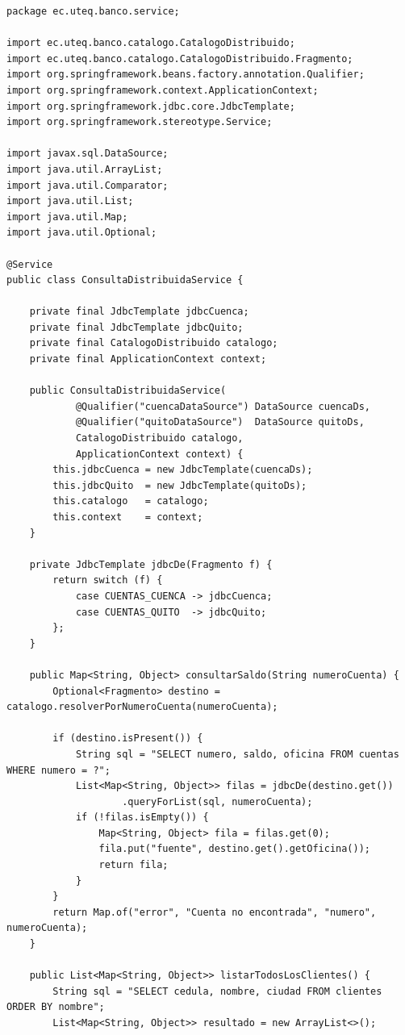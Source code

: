 \documentclass[11pt,a4paper]{article}
\begin{document}
\begin{lstlisting}[style=JavaStyle,caption={ConsultaDistribuidaService.java: consulta y union de resultados}]
package ec.uteq.banco.service;

import ec.uteq.banco.catalogo.CatalogoDistribuido;
import ec.uteq.banco.catalogo.CatalogoDistribuido.Fragmento;
import org.springframework.beans.factory.annotation.Qualifier;
import org.springframework.context.ApplicationContext;
import org.springframework.jdbc.core.JdbcTemplate;
import org.springframework.stereotype.Service;

import javax.sql.DataSource;
import java.util.ArrayList;
import java.util.Comparator;
import java.util.List;
import java.util.Map;
import java.util.Optional;

@Service
public class ConsultaDistribuidaService {

    private final JdbcTemplate jdbcCuenca;
    private final JdbcTemplate jdbcQuito;
    private final CatalogoDistribuido catalogo;
    private final ApplicationContext context;

    public ConsultaDistribuidaService(
            @Qualifier("cuencaDataSource") DataSource cuencaDs,
            @Qualifier("quitoDataSource")  DataSource quitoDs,
            CatalogoDistribuido catalogo,
            ApplicationContext context) {
        this.jdbcCuenca = new JdbcTemplate(cuencaDs);
        this.jdbcQuito  = new JdbcTemplate(quitoDs);
        this.catalogo   = catalogo;
        this.context    = context;
    }

    private JdbcTemplate jdbcDe(Fragmento f) {
        return switch (f) {
            case CUENTAS_CUENCA -> jdbcCuenca;
            case CUENTAS_QUITO  -> jdbcQuito;
        };
    }

    public Map<String, Object> consultarSaldo(String numeroCuenta) {
        Optional<Fragmento> destino = catalogo.resolverPorNumeroCuenta(numeroCuenta);

        if (destino.isPresent()) {
            String sql = "SELECT numero, saldo, oficina FROM cuentas WHERE numero = ?";
            List<Map<String, Object>> filas = jdbcDe(destino.get())
                    .queryForList(sql, numeroCuenta);
            if (!filas.isEmpty()) {
                Map<String, Object> fila = filas.get(0);
                fila.put("fuente", destino.get().getOficina());
                return fila;
            }
        }
        return Map.of("error", "Cuenta no encontrada", "numero", numeroCuenta);
    }

    public List<Map<String, Object>> listarTodosLosClientes() {
        String sql = "SELECT cedula, nombre, ciudad FROM clientes ORDER BY nombre";
        List<Map<String, Object>> resultado = new ArrayList<>();


\end{lstlisting}
\end{document}
